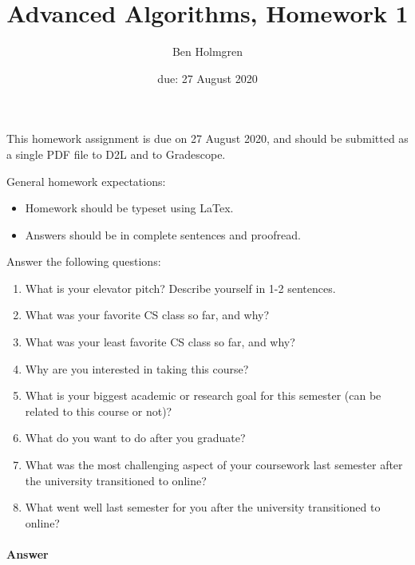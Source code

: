 \documentclass{article}
\title{Advanced Algorithms, Homework 1}
\author{Ben Holmgren}
\date{due: 27 August 2020}
\begin{document}
\maketitle

This homework assignment is due on 27 August 2020, and should be
submitted as a single PDF file to D2L and to Gradescope.

General homework expectations:
\begin{itemize}
    \item Homework should be typeset using LaTex.
    \item Answers should be in complete sentences and proofread.
\end{itemize}

\nextprob
{}

Answer the following questions:
\begin{enumerate}
    \item What is your elevator pitch?  Describe yourself in 1-2
                sentences.
    \item What was your favorite CS class so far, and why?
    \item What was your least favorite CS class so far, and why?
    \item Why are you interested in taking this course?
    \item What is your biggest academic or research goal for this semester (can
        be related to this course or not)?
    \item What do you want to do after you graduate?
	\item What was the most challenging aspect of your coursework last semester
        after the university transitioned to online?
    \item What went well last semester for you after the university transitioned
        to online?
\end{enumerate}

\paragraph{Answer}
\end{document}
